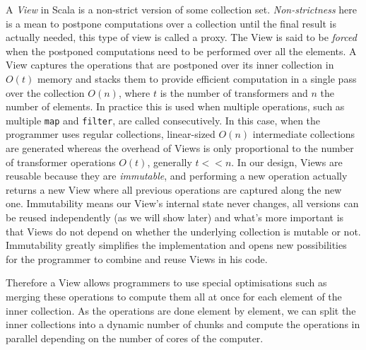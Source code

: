 \documentclass[a4paper,12pt,twocolumn]{article}
\begin{document}
A {\it View} in Scala is a non-strict version of some collection set.
{\it Non-strictness} here is a mean to postpone computations over a collection until the final result is actually needed, this type of view is called a proxy.
The View is said to be {\it forced} when the postponed computations need to be performed over all the elements. %
A View captures the operations that are postponed over its inner collection in $O(t)$ memory and stacks them to provide efficient computation in a single pass over the collection $O(n)$, where $t$ is the number of transformers and $n$ the number of elements.
In practice this is used when multiple operations, such as multiple \verb|map| and \verb|filter|, are called consecutively.
In this case, when the programmer uses regular collections, linear-sized $O(n)$ intermediate collections are generated whereas the overhead of Views is only proportional to the number of transformer operations $O(t)$, generally $t << n$.
In our design, Views are reusable because they are {\it immutable}, and performing a new operation actually returns a new View where all previous operations are captured along the new one.
Immutability means our View's internal state never changes, all versions can be reused independently (as we will show later) and what's more important is that Views do not depend on whether the underlying collection is mutable or not.
Immutability greatly simplifies the implementation and opens new possibilities for the programmer to combine and reuse Views in his code.

Therefore a View allows programmers to use special optimisations such as merging these operations to compute them all at once for each element of the inner collection.
As the operations are done element by element, we can split the inner collections into a dynamic number of chunks and compute the operations in parallel depending on the number of cores of the computer.
\end{document}
